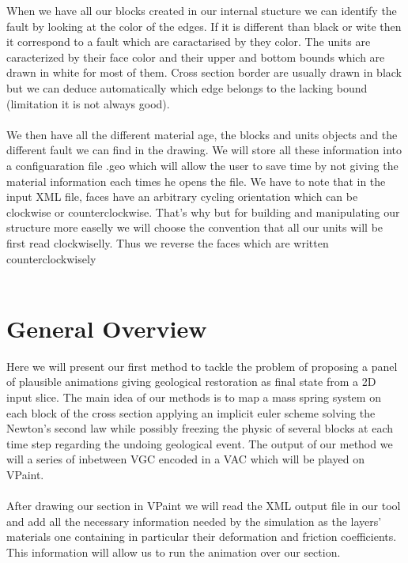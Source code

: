 \documentclass[12pt, a4paper]{memoir} %
\begin{document}
When we have all our blocks created in our internal stucture we can identify the fault by looking at the color of the edges. If it is different than black or wite then it correspond to a fault which are caractarised by they color. The units are caracterized by their face color and their upper and bottom bounds which are drawn in white for most of them. Cross section border are usually drawn in black but we can deduce automatically which edge belongs to the lacking bound (limitation it is not always good).\\\\

We then have all the different material age, the blocks and units objects and the different fault we can find in the drawing. We will store all these information into a configuaration file .geo which will allow the user to save time by not giving the material information each times he opens the file. We have to note that in the input XML file, faces have an arbitrary cycling orientation which can be clockwise or counterclockwise. That's why but for building and manipulating our structure more easelly we will choose the convention that all our units will be first read clockwiselly. Thus we reverse the faces which are written counterclockwisely\\\\

\section{General Overview}

Here we will present our first method to tackle the problem of proposing a panel of plausible animations giving geological restoration as final state from a 2D input slice. 
The main idea of our methods is to map a mass spring system on each block of the cross section applying an implicit euler scheme solving the Newton's second law while possibly freezing the physic of several blocks at each time step regarding the undoing geological event. The output of our method we will a series of inbetween VGC encoded in a VAC which will be played on VPaint.\\\\
After drawing our section in VPaint we will read the XML output file in our tool  and add all the necessary information needed by the simulation as the layers' materials one containing in particular their deformation and friction coefficients. This information will allow us to run the animation over our section.\\
\end{document}
